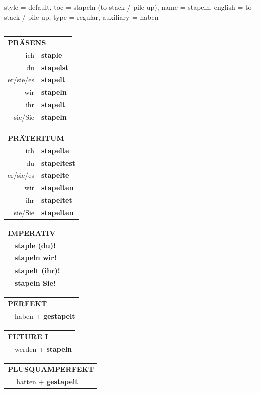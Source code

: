\begin{verbentry}{
  style = {default},
  toc = {stapeln (to stack / pile up)},
  name = {stapeln},
  english = {to stack / pile up},
  type = {regular},
  auxiliary = {haben}
}


\vspace{5pt}
\hrule
\vspace{5pt}

\begin{tabular}{rl}
\multicolumn{2}{l}{\textbf{PRÄSENS}}\\
ich & \textbf{staple}\\
du & \textbf{stapelst}\\
er/sie/es & \textbf{stapelt}\\
wir & \textbf{stapeln}\\
ihr & \textbf{stapelt}\\
sie/Sie & \textbf{stapeln}\\
\end{tabular}
\hfill
\begin{tabular}{rl}
\multicolumn{2}{l}{\textbf{PRÄTERITUM}}\\
ich & \textbf{stapelte}\\
du & \textbf{stapeltest}\\
er/sie/es & \textbf{stapelte}\\
wir & \textbf{stapelten}\\
ihr & \textbf{stapeltet}\\
sie/Sie & \textbf{stapelten}\\
\end{tabular}
\hfill
\begin{tabular}{rl}
\multicolumn{2}{l}{\textbf{IMPERATIV}}\\
& \textbf{staple (du)!}\\
& \textbf{stapeln wir!}\\
& \textbf{stapelt (ihr)!}\\
& \textbf{stapeln Sie!}\\
\end{tabular}

\vspace{10pt}

\begin{tabular}{rl}
\multicolumn{2}{l}{\textbf{PERFEKT}}\\
& haben + \textbf{gestapelt}\\
\end{tabular}
\hfill
\begin{tabular}{rl}
\multicolumn{2}{l}{\textbf{FUTURE I}}\\
& werden + \textbf{stapeln}\\
\end{tabular}
\hfill
\begin{tabular}{rl}
\multicolumn{2}{l}{\textbf{PLUSQUAMPERFEKT}}\\
& hatten + \textbf{gestapelt}\\
\end{tabular}


\end{verbentry}
